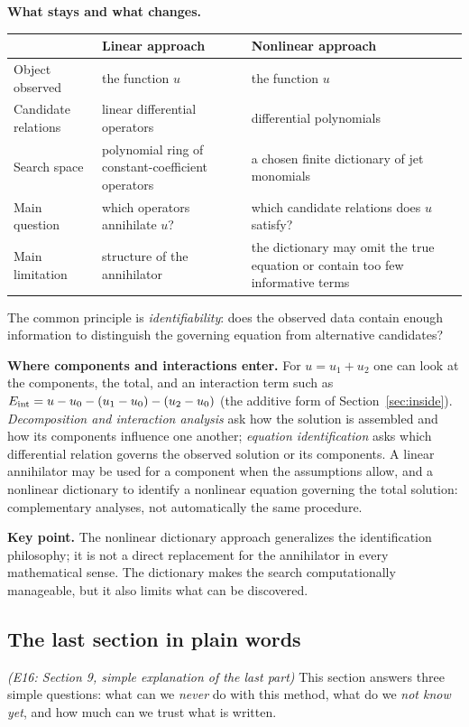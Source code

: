 \medskip\textbf{What stays and what changes.}
\begin{center}\small
\begin{tabular}{@{}L{2.9cm}L{5.6cm}L{5.8cm}@{}}
\toprule
 & Linear approach & Nonlinear approach\\\midrule
Object observed & the function $u$ & the function $u$\\
Candidate relations & linear differential operators & differential polynomials\\
Search space & polynomial ring of constant-coefficient operators & a chosen finite dictionary of jet monomials\\
Main question & which operators annihilate $u$? & which candidate relations does $u$ satisfy?\\
Main limitation & structure of the annihilator & the dictionary may omit the true equation or contain too few informative terms\\
\bottomrule
\end{tabular}
\end{center}
The common principle is \emph{identifiability}: does the observed data contain enough information to distinguish the governing equation from alternative candidates?

\medskip\textbf{Where components and interactions enter.} For $u=u_1+u_2$ one can look at the components, the total, and an interaction term such as $E_{\mathrm{int}}=u-u_0-(u_1-u_0)-(u_2-u_0)$ (the additive form of Section~\ref{sec:inside}). \emph{Decomposition and interaction analysis} ask how the solution is assembled and how its components influence one another; \emph{equation identification} asks which differential relation governs the observed solution or its components. A linear annihilator may be used for a component when the assumptions allow, and a nonlinear dictionary to identify a nonlinear equation governing the total solution: complementary analyses, not automatically the same procedure.

\medskip\textbf{Key point.} The nonlinear dictionary approach generalizes the identification philosophy; it is not a direct replacement for the annihilator in every mathematical sense. The dictionary makes the search computationally manageable, but it also limits what can be discovered.

\subsection{The last section in plain words}\label{expl:E16}
\noindent\emph{(E16: Section 9, simple explanation of the last part)}
This section answers three simple questions: what can we \emph{never} do with this method, what do we \emph{not know yet}, and how much can we trust what is written.

